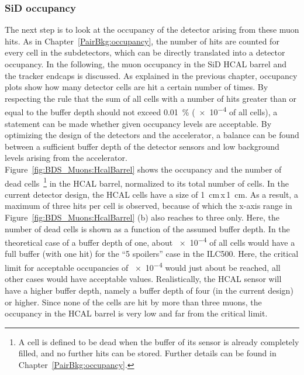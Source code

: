 \subsubsection{SiD occupancy}
The next step is to look at the occupancy of the detector arising from these muon hits.
As in Chapter~\ref{PairBkg:occupancy}, the number of hits are counted for every cell in the subdetectors, which can be directly translated into a detector occupancy.
In the following, the muon occupancy in the SiD HCAL barrel and the tracker endcaps is discussed.
As explained in the previous chapter, occupancy plots show how many detector cells are hit a certain number of times. 
By respecting the rule that the sum of all cells with a number of hits greater than or equal to the buffer depth should not exceed \SI{0.01}{\percent} (\num{e-4} of all cells), a statement can be made whether given occupancy levels are acceptable.
By optimizing the design of the detectors and the accelerator, a balance can be found between a sufficient buffer depth of the detector sensors and low background levels arising from the accelerator.
\\Figure~\ref{fig:BDS_Muons:HcalBarrel} shows the occupancy and the number of dead cells~\footnote{A cell is defined to be dead when the buffer of its sensor is already completely filled, and no further hits can be stored. Further details can be found in Chapter~\ref{PairBkg:occupancy}.} in the HCAL barrel, normalized to its total number of cells.
In the current detector design, the HCAL cells have a size of \SI{1}{\centi\meter}\,x\,\SI{1}{\centi\meter}.
As a result, a maximum of three hits per cell is observed, because of which the x-axis range in Figure~\ref{fig:BDS_Muons:HcalBarrel} (b) also reaches to three only.
Here, the number of dead cells is shown as a function of the assumed buffer depth.
In the theoretical case of a buffer depth of one, about \num{e-4} of all cells would have a full buffer (with one hit) for the ``5 spoilers'' case in the ILC500.
Here, the critical limit for acceptable occupancies of \num{e-4} would just about be reached, all other cases would have acceptable values.
Realistically, the HCAL sensor will have a higher buffer depth, namely a buffer depth of four (in the current design) or higher.
Since none of the cells are hit by more than three muons, the occupancy in the HCAL barrel is very low and far from the critical limit.
